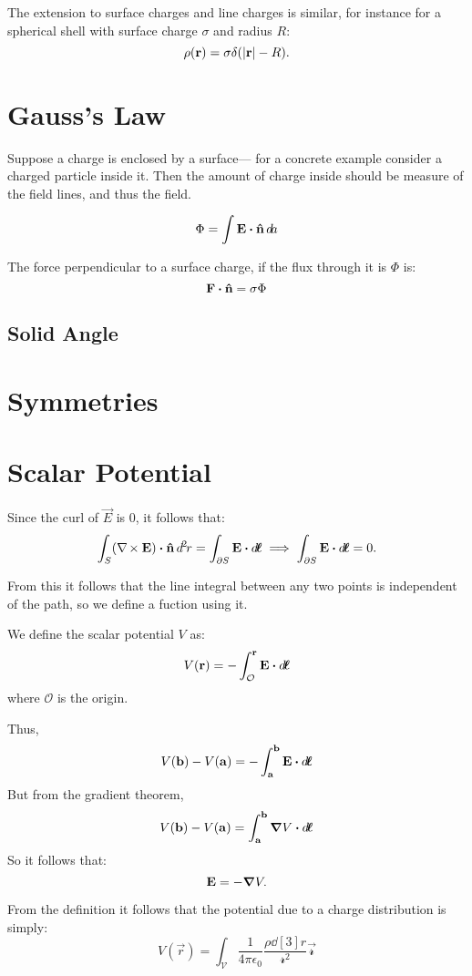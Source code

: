 The extension to surface charges and line charges is similar, for instance for a spherical shell with 
surface charge $\sigma$ and radius $R$:
\[
\rho(\mathbf{\boldsymbol{r}}) = \sigma \delta(\abs{\mathbf{\boldsymbol{r}}} - R).
\]


\section{Gauss's Law}

Suppose a charge is enclosed by a surface--- for a concrete example consider a charged particle inside it. 
Then the amount of charge inside should be measure of the field lines, and thus the field. 

\[
\Phi = \int \vec{E} \vdot \uvec{n} \dd{a}  
\]

The force perpendicular to a surface charge, if the flux through it is $\Phi$ is:
\[
\vec{F} \vdot \uvec{n}  = \sigma \Phi 
\]

\subsection{Solid Angle}

\section{Symmetries}

\section{Scalar Potential}

Since the curl of $\vec{E}$ is 0, it follows that:
\[
\int_{S} (\curl{\vec{E}}) \vdot \uvec{n} \dd[2]{r} = \int_{\partial S} \vec{E} \vdot \dd{\vec{\ell}} \implies 
\int_{\partial S} \vec{E} \vdot \dd{\vec{\ell}} = 0.
\]

From this it follows that the line integral between any two points is independent of the path, so we define 
a fuction using it.

\begin{definition}
    We define the scalar potential $V$ as:
    \begin{equation}
        V(\vec{r}) = -\int_{\mathcal{O}}^\vec{r} \vec{E} \vdot \dd{\vec{\ell}} 
    \end{equation}
    where $\mathcal{O}$ is the origin.
\end{definition}

Thus,
\[
 V(\vec{b}) - V(\vec{a}) = -\int_{\vec{a}}^\vec{b} \vec{E} \vdot \dd{\vec{\ell}} 
\]
But from the gradient theorem,
\[
 V(\vec{b}) - V(\vec{a}) = \int_{\vec{a}}^\vec{b} \grad{V} \vdot \dd{\vec{\ell}} 
\]
So it follows that:
\begin{equation}
    \mathbf{\boldsymbol{E}} = -\grad{V}.
\end{equation}

From the definition it follows that the potential due to a charge distribution is simply:
\[
V(\vec{r}) = \int_{\mathcal{V}} \frac{1}{4\pi\epsilon_0} \frac{\rho \dd[3]r}{\mathscr{r}^2} \vec{\mathscr{r}}
\]